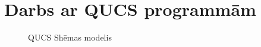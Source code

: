 \documentclass{report}
\begin{document}
\section{Darbs ar QUCS programmām}
    \begin{figure}[h]
        \centering
        \caption{QUCS Shēmas modelis}
        \label{fig:my_label4}
    \end{figure}
\end{document}
